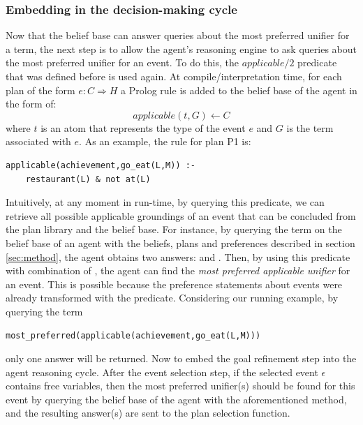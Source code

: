 \subsubsection*{Embedding in the decision-making cycle}
Now that the belief base can answer queries about the most preferred unifier for a term, the next step is to allow the agent's reasoning engine to ask queries about the most preferred unifier for an event. To do this, the $applicable/2$ predicate that was defined before is used again. At compile/interpretation time, for each plan of the form $e : C \Rightarrow H$ a Prolog rule is added to the belief base of the agent in the form of:
\begin{equation*}
applicable(t,G) \leftarrow C
\end{equation*}
where $t$ is an atom that represents the type of the event $e$ and $G$ is the term associated with $e$. As an example, the rule for plan P1 is:
\begin{verbatim}
applicable(achievement,go_eat(L,M)) :-
    restaurant(L) & not at(L)
\end{verbatim}
Intuitively, at any moment in run-time, by querying this predicate, we can retrieve all possible applicable groundings of an event that can be concluded from the plan library and the belief base. For instance, by querying the term  
on the belief base of an agent with the beliefs, plans and preferences described in section \ref{sec:method}, the agent obtains two answers:  and . Then, by using this predicate with combination of , the agent can find the \textit{most preferred applicable unifier} for an event. This is possible because the preference statements about events were already transformed with the  predicate. Considering our running example, by querying the term 
\begin{verbatim}
most_preferred(applicable(achievement,go_eat(L,M)))
\end{verbatim}
only one answer  will be returned. Now to embed the goal refinement step into the agent reasoning cycle.
After the event selection step, if the selected event $\epsilon$ contains free variables, then the most preferred unifier(s) should be found for this event by querying the belief base of the agent with the aforementioned method, and the resulting answer(s) are sent to the plan selection function.


